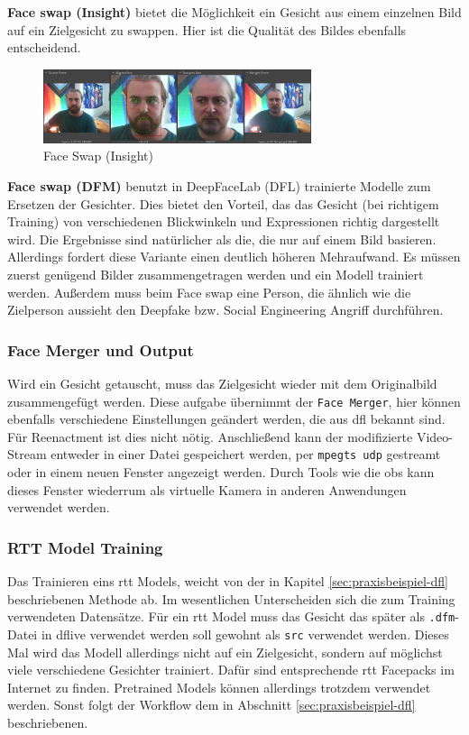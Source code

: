 \textbf{Face swap (Insight)} bietet die Möglichkeit ein Gesicht aus einem einzelnen Bild auf ein Zielgesicht zu swappen.
Hier ist die Qualität des Bildes ebenfalls entscheidend.
\begin{figure}[h]
    \center
    \includegraphics[width=0.7\textwidth]{Bilder/DFLive/Face-swap-ingsight}
    \caption{Face Swap (Insight)}
    \label{fig:dflive-insight-swapping}
\end{figure}

\textbf{Face swap (DFM)} benutzt in DeepFaceLab (DFL) trainierte Modelle zum Ersetzen der Gesichter.
Dies bietet den Vorteil, das das Gesicht (bei richtigem Training) von verschiedenen Blickwinkeln und Expressionen richtig dargestellt wird.
Die Ergebnisse sind natürlicher als die, die nur auf einem Bild basieren.
Allerdings fordert diese Variante einen deutlich höheren Mehraufwand. 
Es müssen zuerst genügend Bilder zusammengetragen werden und ein Modell trainiert werden.
Außerdem muss beim Face swap eine Person, die ähnlich wie die Zielperson aussieht den Deepfake bzw. Social Engineering Angriff durchführen.

\subsubsection*{Face Merger und Output}
Wird ein Gesicht getauscht, muss das Zielgesicht wieder mit dem Originalbild zusammengefügt werden.
Diese aufgabe übernimmt der \texttt{Face Merger}, hier können ebenfalls verschiedene Einstellungen geändert werden, die aus \gls{dfl} bekannt sind.
Für Reenactment ist dies nicht nötig.
Anschließend kann der modifizierte Video-Stream entweder in einer Datei gespeichert werden, per \texttt{mpegts udp} gestreamt oder in einem neuen Fenster angezeigt werden.
Durch Tools wie die \gls{obs} kann dieses Fenster wiederrum als virtuelle Kamera in anderen Anwendungen verwendet werden.

\subsubsection*{RTT Model Training}
Das Trainieren eins \gls{rtt} Models, weicht von der in Kapitel \ref{sec:praxisbeispiel-dfl} beschriebenen Methode ab.
Im wesentlichen Unterscheiden sich die zum Training verwendeten Datensätze.
Für ein \gls{rtt} Model muss das Gesicht das später als \texttt{.dfm}-Datei in \gls{dflive} verwendet werden soll gewohnt als \texttt{src} verwendet werden.
Dieses Mal wird das Modell allerdings nicht auf ein Zielgesicht, sondern auf möglichst viele verschiedene Gesichter trainiert.
Dafür sind entsprechende \gls{rtt} Facepacks im Internet zu finden.
Pretrained Models können allerdings trotzdem verwendet werden.
Sonst folgt der Workflow dem in Abschnitt \ref{sec:praxisbeispiel-dfl} beschriebenen.